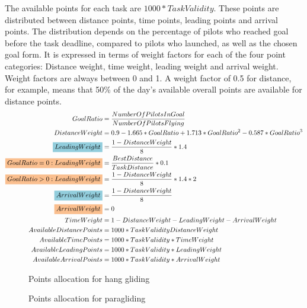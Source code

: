 \documentclass[gap.tex]{subfiles}
\begin{document}
\label{sec:points-allocation}
The available points for each task are \(1000*TaskValidity\). These points are
distributed between distance points, time points, leading points and arrival
points. The distribution depends on the percentage of pilots who reached goal
before the task deadline, compared to pilots who launched, as well as the
chosen goal form. It is expressed in terms of weight factors for each of the
four point categories: Distance weight, time weight, leading weight and arrival
weight. Weight factors are always between 0 and 1. A weight factor of 0.5 for
distance, for example, means that 50\% of the day’s available overall points
are available for distance points.
\begin{align*}
    GoalRatio &= \frac{NumberOfPilotsInGoal}{NumberOfPilotsFlying} \\
    DistanceWeight &= 0.9 - 1.665 * GoalRatio + 1.713 * GoalRatio^2 - 0.587 * GoalRatio^3 \\
    \hgh{LeadingWeight} &= \frac{1 - DistanceWeight}{8} * 1.4 \\
    \pgh{GoalRatio = 0 : LeadingWeight} &= \frac{BestDistance}{TaskDistance} * 0.1 \\
    \pgh{GoalRatio > 0 : LeadingWeight} &= \frac{1 - DistanceWeight}{8} * 1.4 * 2 \\
    \hgh{ArrivalWeight} &= \frac{1 - DistanceWeight}{8} \\
    \pgh{ArrivalWeight} &= 0 \\
    TimeWeight &= 1 - DistanceWeight - LeadingWeight - ArrivalWeight \\
    AvailableDistancePoints &= 1000 * TaskValidity  DistanceWeight \\
    AvailableTimePoints &= 1000 * TaskValidity * TimeWeight \\
    AvailableLeadingPoints &= 1000 * TaskValidity * LeadingWeight \\
    AvailableArrivalPoints &= 1000 * TaskValidity * ArrivalWeight
\end{align*}

\begin{figure}[ht]
    \centering
    
    \caption{Points allocation for hang gliding}
\end{figure}

\begin{figure}[ht]
    \centering
    
    \caption{Points allocation for paragliding}
\end{figure}
\end{document}
